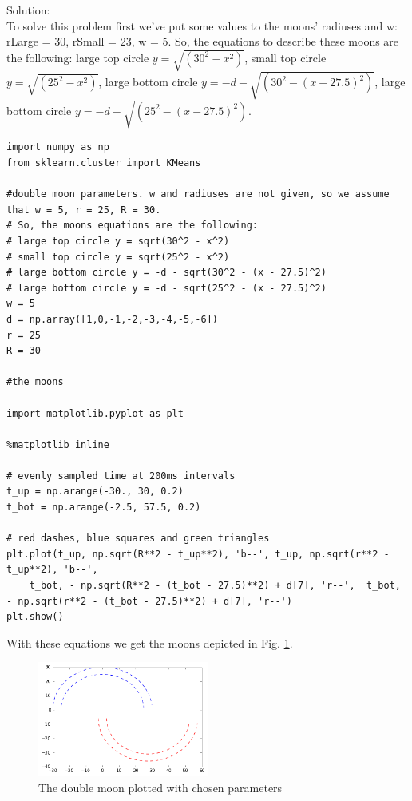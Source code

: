 \documentclass[a4paper, 12pt]{article}
\begin{document}
Solution:\\

To solve this problem first we've put some values to the moons' radiuses and w: rLarge = 30, rSmall = 23, w = 5. So, the equations to describe these moons are the following: large top circle $y = \sqrt{(30^2 - x^2)}$, small top circle $y = \sqrt{(25^2 - x^2)}$, large bottom circle $y = -d - \sqrt{(30^2 - (x - 27.5)^2)}$,  large bottom circle $y = -d - \sqrt{(25^2 - (x - 27.5)^2)}$. 

\lstset{language=Python}
\begin{lstlisting}[frame=single]
import numpy as np
from sklearn.cluster import KMeans

#double moon parameters. w and radiuses are not given, so we assume that w = 5, r = 25, R = 30.
# So, the moons equations are the following:
# large top circle y = sqrt(30^2 - x^2)
# small top circle y = sqrt(25^2 - x^2)
# large bottom circle y = -d - sqrt(30^2 - (x - 27.5)^2)
# large bottom circle y = -d - sqrt(25^2 - (x - 27.5)^2)
w = 5
d = np.array([1,0,-1,-2,-3,-4,-5,-6])
r = 25
R = 30

#the moons

import matplotlib.pyplot as plt

%matplotlib inline

# evenly sampled time at 200ms intervals
t_up = np.arange(-30., 30, 0.2)
t_bot = np.arange(-2.5, 57.5, 0.2)

# red dashes, blue squares and green triangles
plt.plot(t_up, np.sqrt(R**2 - t_up**2), 'b--', t_up, np.sqrt(r**2 - t_up**2), 'b--', 
    t_bot, - np.sqrt(R**2 - (t_bot - 27.5)**2) + d[7], 'r--',  t_bot, - np.sqrt(r**2 - (t_bot - 27.5)**2) + d[7], 'r--')
plt.show()
\end{lstlisting}

With these equations we get the moons depicted in Fig. \ref{fig:moonsPlot}.

\begin{figure}[h]
  \centering
  \caption{The double moon plotted with chosen parameters \label{fig:moonsPlot}}
  \includegraphics[width=0.5\textwidth]{moonsPlot}
\end{figure}
\end{document}
